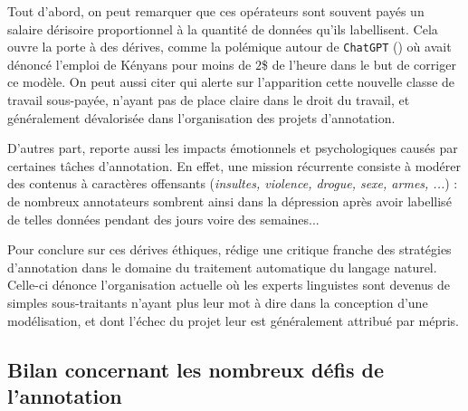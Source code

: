 			Tout d'abord, on peut remarquer que ces opérateurs sont souvent payés un salaire dérisoire proportionnel à la quantité de données qu'ils labellisent.
			Cela ouvre la porte à des dérives, comme la polémique autour de \texttt{ChatGPT} (\cite{openai:2023:chatgpt}) où \cite{perrigo-zorthian:2023:exclusive-openai-used} avait dénoncé l'emploi de Kényans pour moins de $2$\$ de l'heure dans le but de corriger ce modèle.
			On peut aussi citer \cite{dzieza:2023:ai-lot-work} qui alerte sur l'apparition cette nouvelle classe de travail sous-payée, n'ayant pas de place claire dans le droit du travail, et généralement dévalorisée dans l'organisation des projets d'annotation.
			
			D'autres part, \cite{rowe:2023:it-destroyed-me} reporte aussi les impacts émotionnels et psychologiques causés par certaines tâches d'annotation.
			En effet, une mission récurrente consiste à modérer des contenus à caractères offensants (\textit{insultes, violence, drogue, sexe, armes, ...}) : de nombreux annotateurs sombrent ainsi dans la dépression après avoir labellisé de telles données pendant des jours voire des semaines...
			
			\begin{leftBarInformation}
				Pour conclure sur ces dérives éthiques, \cite{valette:2016:analyse-statistique-donnees} rédige une critique franche des stratégies d'annotation dans le domaine du traitement automatique du langage naturel.
				Celle-ci dénonce l'organisation actuelle où les experts linguistes sont devenus de simples sous-traitants n'ayant plus leur mot à dire dans la conception d'une modélisation, et dont l'échec du projet leur est généralement attribué par mépris.
			\end{leftBarInformation}
	
	
	\subsection{Bilan concernant les nombreux défis de l'annotation}
	\label{section:2.3.4-DEFIS-ANNOTATION-BILAN}
	
